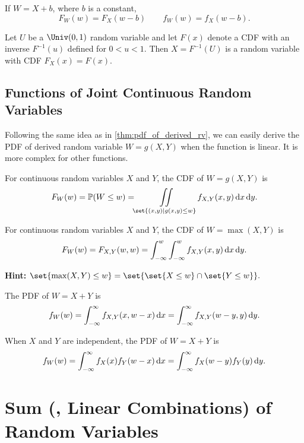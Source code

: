 \begin{theorem}
    If $W=X+b$, where $b$ is a constant,
    \[F_W(w)=F_X(w-b) \qquad f_W(w)=f_X(w-b).\]
\end{theorem}

\begin{theorem}
    Let $U$ be a $\Univ(0,1)$ random variable and let $F(x)$ denote a \textnormal{CDF} with an inverse $F^{-1}(u)$ defined for $0<u<1$. Then $X=F^{-1}(U)$ is a random variable with \textnormal{CDF} $F_X(x)=F(x)$.
\end{theorem}

\subsection{Functions of Joint Continuous Random Variables}
Following the same idea as in \cref{thm:pdf_of_derived_rv}, we can easily derive the PDF of derived random variable $W=g(X,Y)$ when the function is linear. It is more complex for other functions.

\begin{theorem}
    For continuous random variables $X$ and $Y$, the \textnormal{CDF} of $W=g(X,Y)$ is
    \[F_W(w)=\P{W\leq w}=\iint\limits_{\set{(x,y) \mid g(x,y)\leq w}}f_{X,Y}(x,y)\diff x\diff y.\]
\end{theorem}

\begin{corollary}
    For continuous random variables $X$ and $Y$, the \textnormal{CDF} of $W=\max(X,Y)$ is
    \[F_W(w)=F_{X,Y}(w,w)=\int_{-\infty}^{w}\int_{-\infty}^{w}f_{X,Y}(x,y)\mathop{}\!\mathrm{d} x\mathop{}\!\mathrm{d} y.\]
\end{corollary}
\textbf{Hint:} $\set{\max(X,Y)\leq w}=\set{\set{X\leq w}\cap\set{Y\leq w}}.$

\begin{theorem}
    The \textnormal{PDF} of $W=X+Y$ is
    \[f_W(w)=\int_{-\infty}^{\infty}f_{X,Y}(x,w-x)\mathop{}\!\mathrm{d} x = \int_{-\infty}^{\infty}f_{X,Y}(w-y,y)\mathop{}\!\mathrm{d} y.\]
\end{theorem}

\begin{corollary}
    When $X$ and $Y$ are independent, the \textnormal{PDF} of $W=X+Y$ is
    \[f_W(w)=\int_{-\infty}^{\infty}f_{X}(x)f_Y(w-x)\mathop{}\!\mathrm{d} x = \int_{-\infty}^{\infty}f_{X}(w-y)f_Y(y)\mathop{}\!\mathrm{d} y.\]
\end{corollary}

\section{Sum (\ie, Linear Combinations) of Random Variables}
